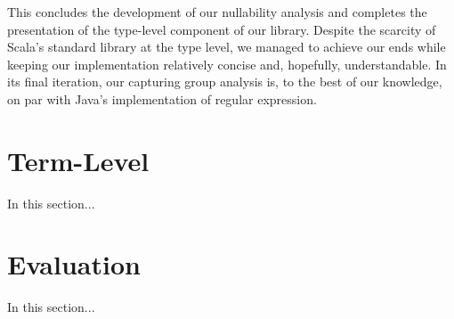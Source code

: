This concludes the development of our nullability analysis and completes the presentation of the type-level component of our library.
Despite the scarcity of Scala's standard library at the type level, we managed to achieve our ends while keeping our implementation relatively concise and, hopefully, understandable.
In its final iteration, our capturing group analysis is, to the best of our knowledge, on par with Java's implementation of regular expression.

\section{Term-Level}
\label{sec:term-level}

In this section...

\section{Evaluation}

In this section...
